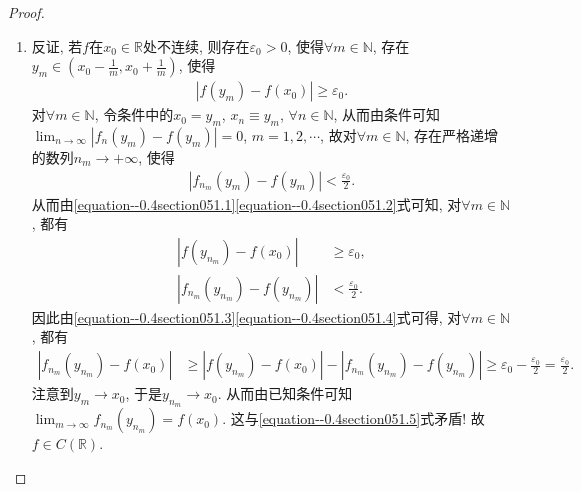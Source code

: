 \documentclass[../../main.tex]{subfiles}
\begin{document}
\begin{proof}
\begin{enumerate}
\item 反证, 若\(f\)在\(x_0\in \mathbb{R}\)处不连续, 则存在\(\varepsilon_0 > 0\), 使得\(\forall m\in \mathbb{N}\), 存在\(y_m\in (x_0 - \frac{1}{m}, x_0 + \frac{1}{m})\), 使得
\begin{align}
|f(y_m) - f(x_0)| \geqslant \varepsilon_0. \label{equation--0.4section051.1}
\end{align}
对\(\forall m\in \mathbb{N}\), 令条件中的\(x_0 = y_m\), \(x_n\equiv y_m\), \(\forall n\in \mathbb{N}\), 从而由条件可知\(\lim_{n\rightarrow \infty}|f_n(y_m) - f(y_m)| = 0\), \(m = 1,2,\cdots\),
故对\(\forall m\in \mathbb{N}\), 存在严格递增的数列\(n_m\rightarrow +\infty\), 使得
\begin{align}
|f_{n_m}(y_m) - f(y_m)| < \frac{\varepsilon_0}{2}. \label{equation--0.4section051.2}
\end{align}
从而由\eqref{equation--0.4section051.1}\eqref{equation--0.4section051.2}式可知, 对\(\forall m\in \mathbb{N}\), 都有
\begin{align}
|f(y_{n_m}) - f(x_0)| &\geqslant \varepsilon_0, \label{equation--0.4section051.3}\\
|f_{n_m}(y_{n_m}) - f(y_{n_m})| &< \frac{\varepsilon_0}{2}. \label{equation--0.4section051.4}
\end{align}
因此由\eqref{equation--0.4section051.3}\eqref{equation--0.4section051.4}式可得, 对\(\forall m\in \mathbb{N}\), 都有
\begin{align}
|f_{n_m}(y_{n_m}) - f(x_0)| &\geqslant |f(y_{n_m}) - f(x_0)| - |f_{n_m}(y_{n_m}) - f(y_{n_m})| \geqslant \varepsilon_0 - \frac{\varepsilon_0}{2} = \frac{\varepsilon_0}{2}. \label{equation--0.4section051.5}
\end{align}
注意到\(y_m\rightarrow x_0\), 于是\(y_{n_m}\rightarrow x_0\). 从而由已知条件可知\(\lim_{m\rightarrow \infty}f_{n_m}(y_{n_m}) = f(x_0)\). 这与\eqref{equation--0.4section051.5}式矛盾! 故\(f\in C(\mathbb{R})\). 
\end{enumerate}
\end{proof}
\end{document}
